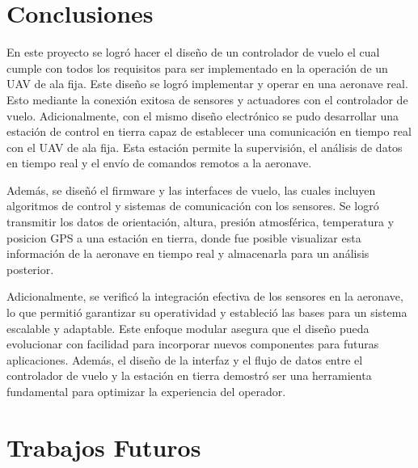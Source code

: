 
\section{Conclusiones}



En este proyecto se logró hacer el diseño de un controlador de vuelo el cual cumple con todos los requisitos para ser implementado en la operación de un UAV de ala fija. Este diseño se logró implementar y operar en una aeronave real. Esto mediante la conexión exitosa de sensores y actuadores con el controlador de vuelo. Adicionalmente, con el mismo diseño electrónico se pudo desarrollar una estación de control en tierra capaz de establecer una comunicación en tiempo real con el UAV de ala fija. Esta estación permite la supervisión, el análisis de datos en tiempo real y el envío de comandos remotos a la aeronave. \vspace{5px}

Además, se diseñó el firmware y las interfaces de vuelo, las cuales incluyen algoritmos de control y sistemas de comunicación con los sensores. Se logró transmitir los datos de orientación, altura, presión atmosférica, temperatura y posicion GPS a una estación en tierra, donde fue posible visualizar esta información de la aeronave en tiempo real y almacenarla para un análisis posterior.\vspace{5px}

Adicionalmente, se verificó la integración efectiva de los sensores en la aeronave, lo que permitió garantizar su operatividad y estableció las bases para un sistema escalable y adaptable. Este enfoque modular asegura que el diseño pueda evolucionar con facilidad para incorporar nuevos componentes para futuras aplicaciones. Además, el diseño de la interfaz y el flujo de datos entre el controlador de vuelo y la estación en tierra demostró ser una herramienta fundamental para optimizar la experiencia del operador.\vspace{5px}


\section{Trabajos Futuros}\vspace{5px}

